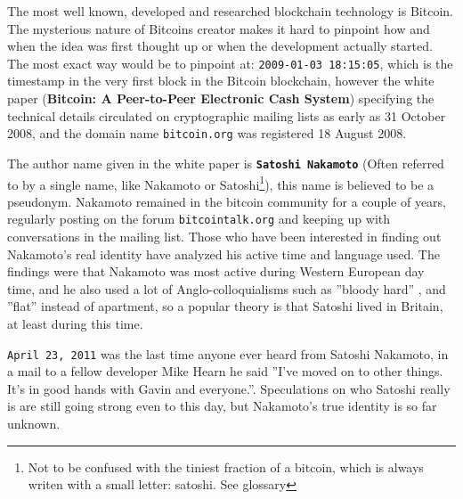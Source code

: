The most well known, developed and researched blockchain technology is Bitcoin.
The mysterious nature of Bitcoins creator makes it hard to pinpoint how
and when the idea was first thought up or when the development actually started. The
most exact way would be to pinpoint at:
\texttt{2009-01-03 18:15:05}, which is the timestamp in the very
first block in the Bitcoin blockchain, however the white paper (\textbf{Bitcoin:
A Peer-to-Peer Electronic Cash System})\cite{genesis}\cite{nakamoto_bitcoin} specifying the
technical details circulated on cryptographic mailing lists as early as 31
October 2008, and the domain name \texttt{bitcoin.org} was registered 18 August
2008.\cite{bernard_2018}


The author name given in the white paper is 
\textbf{\texttt{Satoshi Nakamoto}} (Often referred to by a single name, like Nakamoto or Satoshi\footnote{Not to be confused with the tiniest fraction of a bitcoin, which is always writen with a small letter: satoshi. See glossary}),
this name is believed to be a pseudonym. Nakamoto remained in the bitcoin
community for a couple of years, regularly posting on the forum
\texttt{bitcointalk.org} and keeping up with conversations in the mailing list.
Those who have been interested in finding out Nakamoto's real identity have
analyzed his active time and language used. The findings were that Nakamoto was
most active during Western European day time, and he also used a lot of
Anglo-colloquialisms such as ''bloody hard'' \cite{nakamoto_bloody}, and
''flat'' instead of apartment, so a popular theory is that Satoshi lived in
Britain, at least during this time.\cite{bernard_2018}

\texttt{April 23, 2011} was the last time anyone ever heard from Satoshi
Nakamoto, in a mail to a fellow developer Mike Hearn he said ''I've moved on to
other things.  It's in good hands with Gavin and everyone.''.\cite{nakamoto_last_mail}
Speculations on who Satoshi really is are still going strong even to this day, but
Nakamoto's true identity is so far unknown.\cite{bernard_2018}\cite{jeffries_2013}

